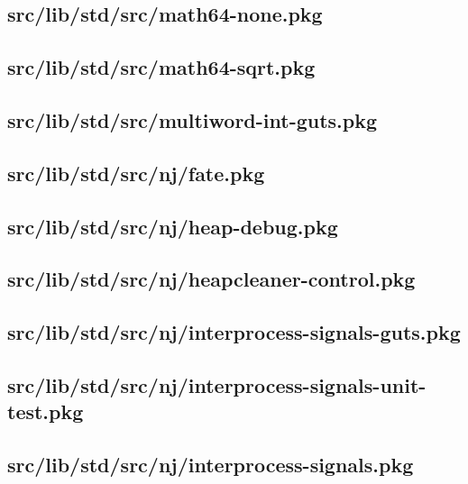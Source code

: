 \subsection{src/lib/std/src/math64-none.pkg}


\subsection{src/lib/std/src/math64-sqrt.pkg}


\subsection{src/lib/std/src/multiword-int-guts.pkg}


\subsection{src/lib/std/src/nj/fate.pkg}


\subsection{src/lib/std/src/nj/heap-debug.pkg}


\subsection{src/lib/std/src/nj/heapcleaner-control.pkg}


\subsection{src/lib/std/src/nj/interprocess-signals-guts.pkg}


\subsection{src/lib/std/src/nj/interprocess-signals-unit-test.pkg}


\subsection{src/lib/std/src/nj/interprocess-signals.pkg}


